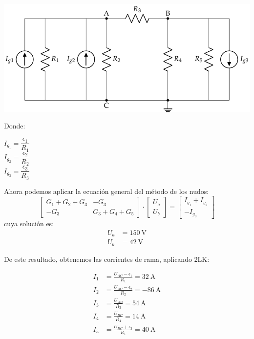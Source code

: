 \documentclass[10pt]{article}
\begin{document}
\vspace{2mm}
\begin{minipage}{0.9\linewidth}
  \includegraphics[scale=1.15]{figs/ejercicio5_coleccion_nudos2.pdf}
\end{minipage}
\begin{minipage}{0.1\linewidth}
    Donde:
    \vspace{3mm}
    
    $I_{g_1} = \dfrac{\epsilon_1}{R_1}$\\[6pt]
    $I_{g_2} = \dfrac{\epsilon_2}{R_2}$\\[6pt]   
    $I_{g_3} = \dfrac{\epsilon_3}{R_3}$
\end{minipage}

\vspace{4mm}

Ahora podemos aplicar la ecuación general del método de los nudos:
\begin{equation*}
  \begin{bmatrix}
    G_1 + G_2 + G_3 & -G_3 \\
    -G_3 & G_3 + G_4 + G_5  
  \end{bmatrix}
  \cdot
  \begin{bmatrix}
    U_a\\
    U_b
  \end{bmatrix}
  =
  \begin{bmatrix}
    I_{g_1} + I_{g_2}\\
    -I_{g_3}
  \end{bmatrix}
\end{equation*}
cuya solución es:
\begin{align*}
  U_a &= \qty{150}{\volt}\\
  U_b &= \qty{42}{\volt}
\end{align*}

De este resultado, obtenemos las corrientes de rama, aplicando 2LK:

\begin{align*}
  I_1 &= \frac{U_{AC} - \epsilon_1}{R_1} = \boxed{\qty{32}{\ampere}}\\[6pt]
  I_2 &= \frac{U_{AC} - \epsilon_2}{R_2} = \boxed{\qty{-86}{\ampere}}\\[6pt]
  I_3 &= \frac{U_{AB}}{R_3} = \boxed{\qty{54}{\ampere}}\\[6pt]
  I_4 &= \frac{U_{BC}}{R_4} = \boxed{\qty{14}{\ampere}}\\[6pt]
  I_5 &= \frac{U_{BC} + \epsilon_3}{R_1} = \boxed{\qty{40}{\ampere}}
\end{align*}
\end{document}

